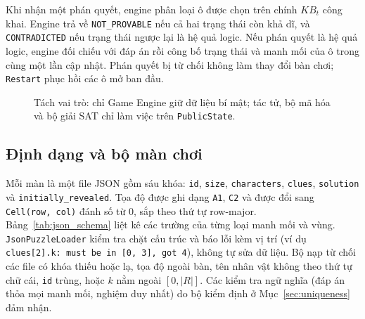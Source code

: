 \documentclass[12pt,a4paper]{article}
\begin{document}
Khi nhận một phán quyết, engine phân loại ô được chọn trên chính $KB_t$ công khai. Engine trả về \texttt{NOT\_PROVABLE} nếu cả hai trạng thái còn khả dĩ, và \texttt{CONTRADICTED} nếu trạng thái ngược lại là hệ quả logic. Nếu phán quyết là hệ quả logic, engine đối chiếu với đáp án rồi công bố trạng thái và manh mối của ô trong cùng một lần cập nhật. Phán quyết bị từ chối không làm thay đổi bàn chơi; \texttt{Restart} phục hồi các ô mở ban đầu.

\begin{figure}[H]
\centering
{}
\caption{Tách vai trò: chỉ Game Engine giữ dữ liệu bí mật; tác tử, bộ mã hóa và bộ giải SAT chỉ làm việc trên \texttt{PublicState}.}
\label{fig:architecture}
\end{figure}

    \subsection{Định dạng và bộ màn chơi}
Mỗi màn là một file JSON gồm sáu khóa: \texttt{id}, \texttt{size}, \texttt{characters}, \texttt{clues}, \texttt{solution} và \texttt{initially\_revealed}. Tọa độ được ghi dạng \texttt{A1}, \texttt{C2} và được đổi sang \texttt{Cell(row, col)} đánh số từ $0$, sắp theo thứ tự row-major. Bảng~\ref{tab:json_schema} liệt kê các trường của từng loại manh mối và vùng. \texttt{JsonPuzzleLoader} kiểm tra chặt cấu trúc và báo lỗi kèm vị trí (ví dụ \texttt{clues[2].k: must be in [0, 3], got 4}), không tự sửa dữ liệu. Bộ nạp từ chối các file có khóa thiếu hoặc lạ, tọa độ ngoài bàn, tên nhân vật không theo thứ tự chữ cái, \texttt{id} trùng, hoặc $k$ nằm ngoài $[0, |R|]$. Các kiểm tra ngữ nghĩa (đáp án thỏa mọi manh mối, nghiệm duy nhất) do bộ kiểm định ở Mục~\ref{sec:uniqueness} đảm nhận.
\end{document}
